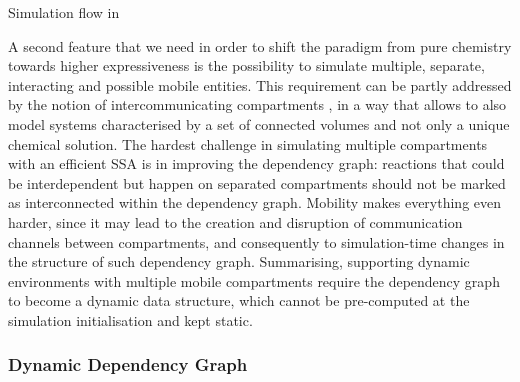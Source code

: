 \documentclass[12pt,a4paper,twoside,openright]{book}
\begin{document}
\begin{algorithm}
\begin{distribalgo}[1]
\vspace{5pt}
  \ENDFOR
\ENDFOR
{}
      \ENDFOR
    \ENDIF
\ENDWHILE
\caption{Simulation flow in \alchemist{}}
\label{algo:engine}
\end{distribalgo}
\end{algorithm}

A second feature that we need in order to shift the paradigm from pure chemistry towards higher expressiveness is the possibility to simulate multiple, separate, interacting and possible mobile entities.
%
This requirement can be partly addressed by the notion of intercommunicating compartments \cite{CiocchettaH09,versari08,montagna-cs2bio10,btssoc-jos7}, in a way that allows to also model systems characterised by a set of connected volumes and not only a unique chemical solution.
%
The hardest challenge in simulating multiple compartments with an efficient SSA is in improving the dependency graph: reactions that could be interdependent but happen on separated compartments should not be marked as interconnected within the dependency graph.
%
Mobility makes everything even harder, since it may lead to the creation and disruption of communication channels between compartments, and consequently to simulation-time changes in the structure of such dependency graph.
%
Summarising, supporting dynamic environments with multiple mobile compartments require the dependency graph to become a dynamic data structure, which cannot be pre-computed at the simulation initialisation and kept static.

\subsubsection{Dynamic Dependency Graph}
\end{document}
